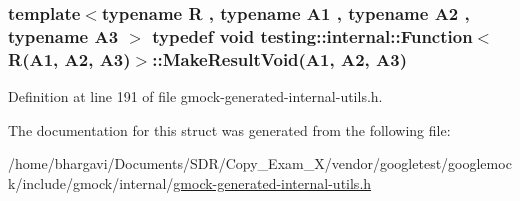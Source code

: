\subsubsection[{\texorpdfstring{Make\+Result\+Void}{MakeResultVoid}}]{\setlength{\rightskip}{0pt plus 5cm}template$<$typename R , typename A1 , typename A2 , typename A3 $>$ typedef void {\bf testing\+::internal\+::\+Function}$<$ {\bf R}(A1, A2, A3)$>$\+::Make\+Result\+Void(A1, A2, A3)}\hypertarget{structtesting_1_1internal_1_1_function_3_01_r_07_a1_00_01_a2_00_01_a3_08_4_a6b9f583a9ef6755cc92ce2b7fa255b84}{}\label{structtesting_1_1internal_1_1_function_3_01_r_07_a1_00_01_a2_00_01_a3_08_4_a6b9f583a9ef6755cc92ce2b7fa255b84}


Definition at line 191 of file gmock-\/generated-\/internal-\/utils.\+h.



The documentation for this struct was generated from the following file\+:\begin{DoxyCompactItemize}
\item 
/home/bhargavi/\+Documents/\+S\+D\+R/\+Copy\+\_\+\+Exam\+\_\+X/vendor/googletest/googlemock/include/gmock/internal/\hyperlink{gmock-generated-internal-utils_8h}{gmock-\/generated-\/internal-\/utils.\+h}\end{DoxyCompactItemize}
